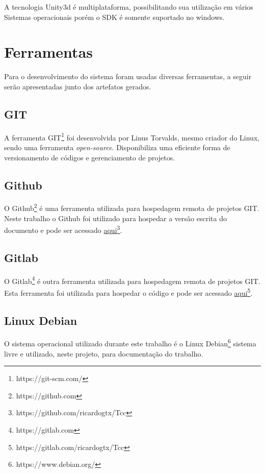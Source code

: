     A tecnologia Unity3d é multiplataforma, possibilitando sua utilização em vários Sistemas operacionais
    porém o SDK é somente suportado no windows.

    \section{Ferramentas}\label{sub:solFerramentas}
      Para o desenvolvimento do sistema foram usadas diversas ferramentas, a seguir serão apresentadas junto
    dos artefatos gerados.

    \subsection{GIT}\label{sub:git}
      A ferramenta GIT\footnote{https://git-scm.com/} foi desenvolvida por Linus Torvalds, mesmo criador do Linux,
    sendo uma ferramenta \textit{open-source}. Disponibiliza uma eficiente forma de versionamento de códigos e
    gerenciamento de projetos.

    \subsection{Github}\label{sub:github}
      O Github\footnote{https://github.com} é uma ferramenta utilizada para hospedagem remota de projetos GIT.
    Neste trabalho o Github foi utilizado para hospedar a versão escrita do documento e pode ser acessado \href{https://github.com/ricardogtx/Tcc}{aqui}\footnote{https://github.com/ricardogtx/Tcc}.

    \subsection{Gitlab}\label{sub:gitlab}
      O Gitlab\footnote{https://gitlab.com} é outra ferramenta utilizada para hospedagem remota de projetos GIT.
       Esta ferramenta foi utilizada para hospedar o código e pode ser acessado
    \href{https://gitlab.com/ricardogtx/Tcc}{aqui}\footnote{https://gitlab.com/ricardogtx/Tcc}.

    \subsection{Linux Debian}\label{sub:linuxdebian}
    		O sistema operacional utilizado durante este trabalho é o Linux Debian\footnote{https://www.debian.org/} sistema livre
    e utilizado, neste projeto, para documentação do trabalho.

